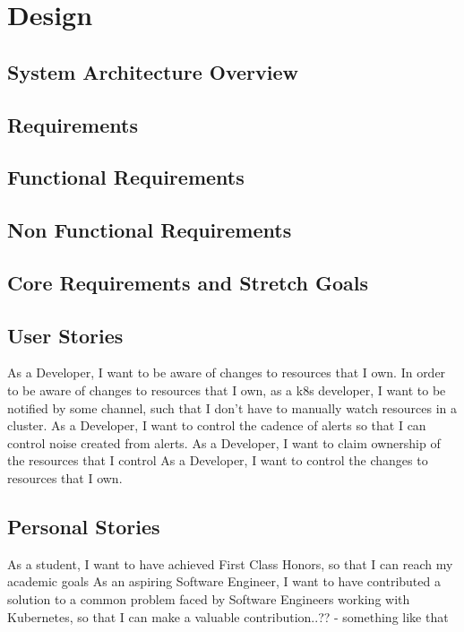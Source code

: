 \documentclass{article}
\begin{document}
\section{Design}



\subsection{System Architecture Overview}



\subsection{Requirements}



\subsection{Functional Requirements}



\subsection{Non Functional Requirements}



\subsection{Core Requirements and Stretch Goals}



\subsection{User Stories}
As a Developer, I want to be aware of changes to resources that I own.
In order to be aware of changes to resources that I own, as a k8s developer, I want to be notified by some channel, such that I don’t have to manually watch resources in a cluster.
As a Developer, I want to control the cadence of alerts so that I can control noise created from alerts.
As a Developer, I want to claim ownership of the resources that I control
As a Developer, I want to control the changes to resources that I own.



\subsection{Personal Stories}
As a student, I want to have achieved First Class Honors, so that I can reach my academic goals
As an aspiring Software Engineer, I want to have contributed a solution to a common problem faced by Software Engineers working with Kubernetes, so that I can make a valuable contribution..?? - something like that
\end{document}
